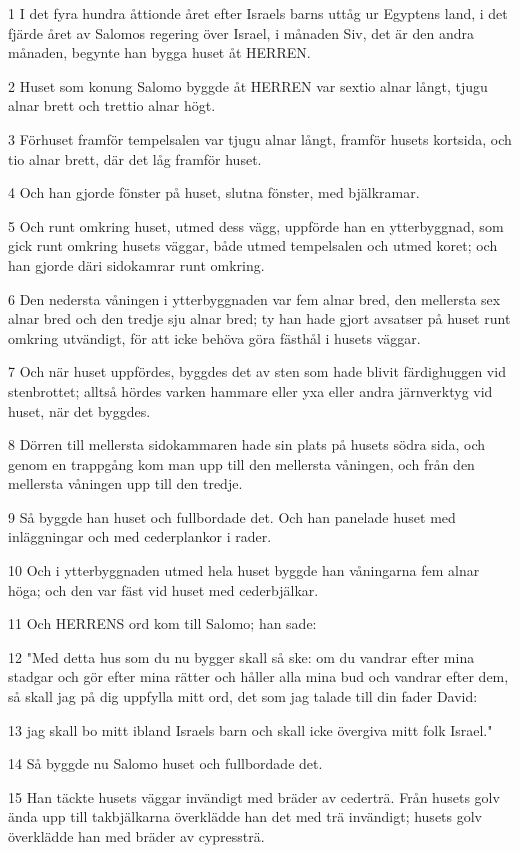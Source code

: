 \par 1 I det fyra hundra åttionde året efter Israels barns uttåg ur Egyptens land, i det fjärde året av Salomos regering över Israel, i månaden Siv, det är den andra månaden, begynte han bygga huset åt HERREN.
\par 2 Huset som konung Salomo byggde åt HERREN var sextio alnar långt, tjugu alnar brett och trettio alnar högt.
\par 3 Förhuset framför tempelsalen var tjugu alnar långt, framför husets kortsida, och tio alnar brett, där det låg framför huset.
\par 4 Och han gjorde fönster på huset, slutna fönster, med bjälkramar.
\par 5 Och runt omkring huset, utmed dess vägg, uppförde han en ytterbyggnad, som gick runt omkring husets väggar, både utmed tempelsalen och utmed koret; och han gjorde däri sidokamrar runt omkring.
\par 6 Den nedersta våningen i ytterbyggnaden var fem alnar bred, den mellersta sex alnar bred och den tredje sju alnar bred; ty han hade gjort avsatser på huset runt omkring utvändigt, för att icke behöva göra fästhål i husets väggar.
\par 7 Och när huset uppfördes, byggdes det av sten som hade blivit färdighuggen vid stenbrottet; alltså hördes varken hammare eller yxa eller andra järnverktyg vid huset, när det byggdes.
\par 8 Dörren till mellersta sidokammaren hade sin plats på husets södra sida, och genom en trappgång kom man upp till den mellersta våningen, och från den mellersta våningen upp till den tredje.
\par 9 Så byggde han huset och fullbordade det. Och han panelade huset med inläggningar och med cederplankor i rader.
\par 10 Och i ytterbyggnaden utmed hela huset byggde han våningarna fem alnar höga; och den var fäst vid huset med cederbjälkar.
\par 11 Och HERRENS ord kom till Salomo; han sade:
\par 12 "Med detta hus som du nu bygger skall så ske: om du vandrar efter mina stadgar och gör efter mina rätter och håller alla mina bud och vandrar efter dem, så skall jag på dig uppfylla mitt ord, det som jag talade till din fader David:
\par 13 jag skall bo mitt ibland Israels barn och skall icke övergiva mitt folk Israel."
\par 14 Så byggde nu Salomo huset och fullbordade det.
\par 15 Han täckte husets väggar invändigt med bräder av cederträ. Från husets golv ända upp till takbjälkarna överklädde han det med trä invändigt; husets golv överklädde han med bräder av cypressträ.
